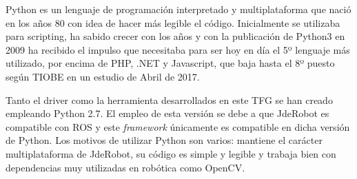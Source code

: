 Python\cite{python} es un lenguaje de programaci\'on interpretado y multiplataforma que naci\'o en los años 80 con idea de hacer más legible el c\'odigo.
Inicialmente se utilizaba para scripting, ha sabido crecer con los años y con la publicaci\'on de Python3 en 2009 ha recibido el impulso que necesitaba para ser hoy en día el 5º lenguaje más utilizado, por encima de PHP, .NET y Javascript, que baja hasta el 8º puesto según TIOBE en un estudio de Abril de 2017.

Tanto el driver como la herramienta desarrollados en este TFG se han creado empleando Python 2.7. El empleo de esta versión se debe a que JdeRobot es compatible con ROS y este \textit{framework} únicamente es compatible en dicha versión de Python. Los motivos de utilizar Python son varios: mantiene el carácter multiplataforma de JdeRobot, su c\'odigo es simple y legible y trabaja bien con dependencias muy utilizadas en rob\'otica como OpenCV.


\cleardoublepage